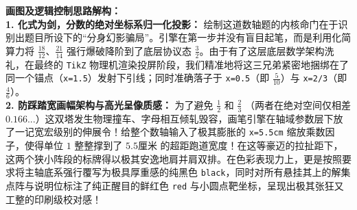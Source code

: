 \documentclass[12pt, a4paper]{ctexrep}
\begin{document}
\begin{center}
\end{center}

\vspace{0.4cm}
{\small\color{blue!70!black}
\textbf{画图及逻辑控制思路解构：}\\
\textbf{1. 化式为剑，分数的绝对坐标系归一化投影：} 绘制这道数轴题的内核命门在于识别出题目所设下的“分身幻影骗局”。引擎在第一步并没有盲目起笔，而是利用化简算力将 $\frac{18}{12}$、$\frac{21}{14}$ 强行爆破降阶到了底层协议态 $\frac{3}{2}$。由于有了这层底层数学架构洗礼，在最终的 \texttt{TikZ} 物理机渲染投屏阶段，我们精准地将这三兄弟紧密地捆绑在了同一个锚点（\texttt{x=1.5}）发射下引线；同时准确落子于 \texttt{x=0.5}（即 $\frac{5}{10}$）与 \texttt{x=2/3}（即 $\frac{4}{6}$）。\\
\textbf{2. 防踩踏宽画幅架构与高光呈像质感：} 为了避免 $\frac{1}{2}$ 和 $\frac{2}{3}$ （两者在绝对空间仅相差 $0.166...$）这双塔发生物理撞车、字母相互倾轧毁容，画笔引擎在轴域参数层下放了一记宽宏级别的伸展令！给整个数轴输入了极其膨胀的 \texttt{x=5.5cm} 缩放乘数因子，使得单位 $1$ 整整撑到了 $5.5\text{厘米}$ 的超距跑道宽度！在这等豪迈的拉扯距下，这两个狭小阵段的标牌得以极其安逸地肩并肩双排。在色彩表现力上，更是按照要求将主轴底系强行覆写为极具厚重感的纯黑色 \texttt{black}，同时对所有悬挂其上的解集点阵与说明位标注了纯正醒目的鲜红色 \texttt{red} 与小圆点靶坐标，呈现出极其张狂又工整的印刷级校对感！
}
\end{document}
